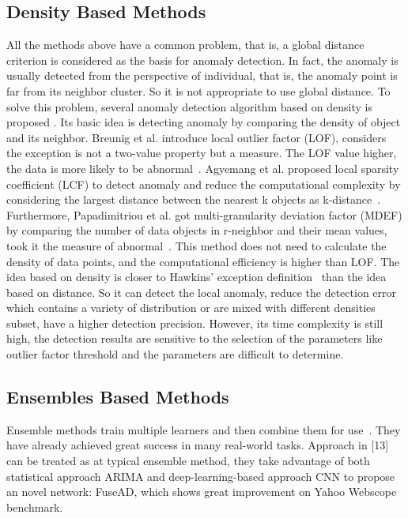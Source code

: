 \subsection{Density Based Methods}
All the methods above have a common problem,
that is,
a global distance criterion is considered as
the basis for anomaly detection.
In fact,
the anomaly is usually detected
from the perspective of individual,
that is,
the anomaly point is far from its neighbor cluster.
So it is not appropriate
to use global distance.
To solve this problem,
several anomaly detection
algorithm based
on density is proposed .
Its basic idea is detecting anomaly by comparing
the density of object and its neighbor.
Breunig et al. introduce local
outlier factor (LOF),
considers the exception is not a
two-value property but a measure.
The LOF value higher,
the data is more likely to be abnormal~\cite{breunig2000lof}.
Agyemang et al.
proposed local sparsity coefficient (LCF) to
detect anomaly and reduce
the computational complexity by considering
the largest distance between the nearest k objects as
k-distance~\cite{agyemang2004algorithm}.
Furthermore,
Papadimitriou et al. got multi-granularity
deviation factor (MDEF) by
comparing the number of data objects in r-neighbor and
their mean values,
took it the measure of abnormal~\cite{papadimitriou2003loci}.
This method does not need to calculate the density of data
points,
and the computational efficiency is higher than LOF.
The idea based on density is closer to Hawkins’ exception
definition~\cite{hawkins1980identification}
than the idea based on distance.
So it can detect the local anomaly,
reduce the detection error which contains
a variety of distribution or are mixed with different
densities subset,
have a higher detection precision.
However,
its time complexity is still high,
the detection
results are sensitive to the selection of the parameters like
outlier factor threshold and the parameters are difficult to
determine.
\subsection{Ensembles Based Methods}

Ensemble methods train multiple learners and
then combine them for use~\cite{zhou2012ensemble}.
They have already achieved great success in many
real-world tasks.
Approach in [13] can be treated as at typical ensemble method, 
they take advantage of both statistical approach ARIMA and
deep-learning-based approach CNN to 
propose an novel network: 
FuseAD, 
which shows great improvement on Yahoo Webscope benchmark.

